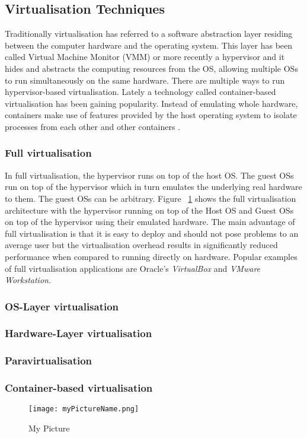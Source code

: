 \subsection{Virtualisation Techniques}

Traditionally virtualisation has referred to a software abstraction layer residing between the computer hardware and the operating system. \cite{taxonomy} This layer has been called Virtual Machine Monitor (VMM) or more recently a hypervisor and it hides and abstracts the computing resources from the OS, allowing multiple OSs to run simultaneously on the same hardware. There are multiple ways to run hypervisor-based virtualisation. Lately a technology called container-based virtualisation has been gaining popularity. Instead of emulating whole hardware, containers make use of features provided by the host operating system to isolate processes from each other and other containers \cite{eder2016hypervisor}.

\subsubsection{Full virtualisation}

In full virtualisation, the hypervisor runs on top of the host OS. The guest OSs run on top of the hypervisor which in turn emulates the underlying real hardware to them. The guest OSs can be arbitrary. Figure ~\ref{fig:full} shows the full virtualisation architecture with the hypervisor running on top of the Host OS and Guest OSs on top of the hypervisor using their emulated hardware. The main advantage of full virtualisation is that it is easy to deploy and should not pose problems to an average user but the virtualisation overhead results in significantly reduced performance when compared to running directly on hardware. Popular examples of full virtualisation applications are Oracle's \textit{VirtualBox}\cite{VirtualBox} and \textit{VMware Workstation}\cite{WorkStation}. 

\subsubsection{OS-Layer virtualisation}

\subsubsection{Hardware-Layer virtualisation}

\subsubsection{Paravirtualisation}

\subsubsection{Container-based virtualisation}

\begin{figure}
\centering
  \texttt{[image: myPictureName.png]}%
  \caption{My Picture}
  \label{fig:full}
\end{figure}